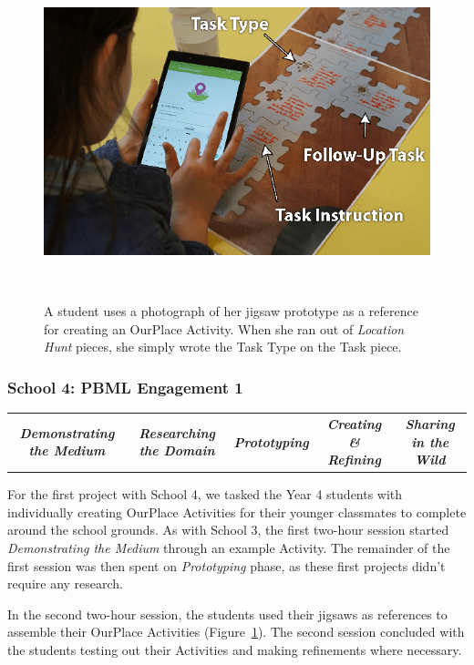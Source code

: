 \begin{figure}
\centering
  \includegraphics[width=0.7\columnwidth]{images/chapter08/jigsawToApp}
  \caption[A student referring to her paper prototype]{A student uses a photograph of her jigsaw prototype as a reference for creating an OurPlace Activity. When she ran out of \textit{Location Hunt} pieces, she simply wrote the Task Type on the Task piece.}~\label{fig:JigsawToApp}
\end{figure}

\subsubsection{School 4: PBML Engagement 1}

\begin{table}[h]
    \centering
    \begin{tabulary}{\textwidth}{C|C|p{19mm}|C|C}
    \small\textit{\textbf{Demonstrating the Medium}} 
    & \small\textit{\textbf{Researching the Domain}}
    & \small\textit{\textbf{Prototyping}}
    & \small\textit{\textbf{Creating \& Refining}}
    & \small\textit{\textbf{Sharing in the Wild}}\\
\end{tabulary}
\end{table}

For the first project with School 4, we tasked the Year 4 students with individually creating OurPlace Activities for their younger classmates to complete around the school grounds. As with School 3, the first two-hour session started \textit{Demonstrating the Medium} through an example Activity. The remainder of the first session was then spent on \textit{Prototyping} phase, as these first projects didn't require any research.

In the second two-hour session, the students used their jigsaws as references to assemble their OurPlace Activities (Figure~\ref{fig:JigsawToApp}). The second session concluded with the students testing out their Activities and making refinements where necessary. 

